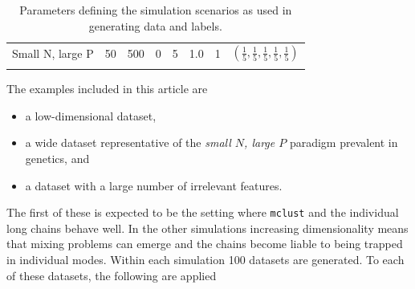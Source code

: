 \documentclass{bioinfo}
\begin{document}
\begin{table}[ht]
\begin{tabular}{l|ccccccc}
		Small N, large P & 50 & 500 & 0 & 5 & 1.0 & 1 &  $(\frac{1}{5} , \frac{1}{5}, \frac{1}{5}, \frac{1}{5}, \frac{1}{5})$\\
		\botrule
	\end{tabular}
	\caption{Parameters defining the simulation scenarios as used in generating data and labels.}
	\label{table:scenarioTable}
\end{table}%

The examples included in this article are
\begin{itemize}
	\item a low-dimensional dataset,
	\item a wide dataset representative of the \emph{small $N$, large $P$} paradigm prevalent in genetics, and
	\item a dataset with a large number of irrelevant features.
\end{itemize}
The first of these is expected to be the setting where \texttt{mclust} and the individual long chains behave well. In the other simulations increasing dimensionality means that mixing problems can emerge and the chains become liable to being trapped in individual modes. Within each simulation 100 datasets are generated.
To each of these datasets, the following are applied
\end{document}
